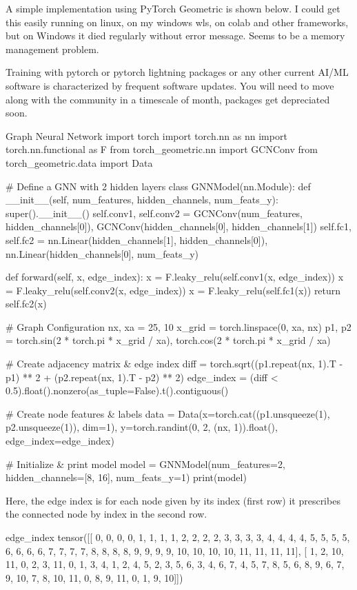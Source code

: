 A simple implementation using PyTorch Geometric is shown below. I could get this easily running on linux, on my windows wls, on colab and other frameworks, but on Windows it died regularly without error message. Seems to be a memory management problem. 

\begin{recommendationbox}
Training with pytorch or pytorch lightning packages or any other current AI/ML software is characterized by frequent software updates. You will need to move along with the community in a timescale of month, packages get depreciated soon. 
\end{recommendationbox}

\begin{codeonly}{Graph Neural Network}
import torch
import torch.nn as nn
import torch.nn.functional as F
from torch_geometric.nn import GCNConv
from torch_geometric.data import Data

# Define a GNN with 2 hidden layers
class GNNModel(nn.Module):
    def __init__(self, num_features, hidden_channels, num_feats_y):
        super().__init__()
        self.conv1, self.conv2 = GCNConv(num_features, hidden_channels[0]), GCNConv(hidden_channels[0], hidden_channels[1])
        self.fc1, self.fc2 = nn.Linear(hidden_channels[1], hidden_channels[0]), nn.Linear(hidden_channels[0], num_feats_y)

    def forward(self, x, edge_index):
        x = F.leaky_relu(self.conv1(x, edge_index))
        x = F.leaky_relu(self.conv2(x, edge_index))
        x = F.leaky_relu(self.fc1(x))
        return self.fc2(x)

# Graph Configuration
nx, xa = 25, 10
x_grid = torch.linspace(0, xa, nx)
p1, p2 = torch.sin(2 * torch.pi * x_grid / xa), torch.cos(2 * torch.pi * x_grid / xa)

# Create adjacency matrix & edge index
diff = torch.sqrt((p1.repeat(nx, 1).T - p1) ** 2 + (p2.repeat(nx, 1).T - p2) ** 2)
edge_index = (diff < 0.5).float().nonzero(as_tuple=False).t().contiguous()

# Create node features & labels
data = Data(x=torch.cat((p1.unsqueeze(1), p2.unsqueeze(1)), dim=1), y=torch.randint(0, 2, (nx, 1)).float(), edge_index=edge_index)

# Initialize & print model
model = GNNModel(num_features=2, hidden_channels=[8, 16], num_feats_y=1)
print(model)
\end{codeonly}

Here, the edge index is for each node given by its index (first row) it prescribes the connected node by index in the second row.  
\begin{codeonly}{edge\_index}
tensor([[ 0,  0,  0,  0,  1,  1,  1,  1,  2,  2,  2,  2,  3,  3,  3,  3,  4,  4,
          4,  4,  5,  5,  5,  5,  6,  6,  6,  6,  7,  7,  7,  7,  8,  8,  8,  8,
          9,  9,  9,  9, 10, 10, 10, 10, 11, 11, 11, 11],
        [ 1,  2, 10, 11,  0,  2,  3, 11,  0,  1,  3,  4,  1,  2,  4,  5,  2,  3,
          5,  6,  3,  4,  6,  7,  4,  5,  7,  8,  5,  6,  8,  9,  6,  7,  9, 10,
          7,  8, 10, 11,  0,  8,  9, 11,  0,  1,  9, 10]])
\end{codeonly}

